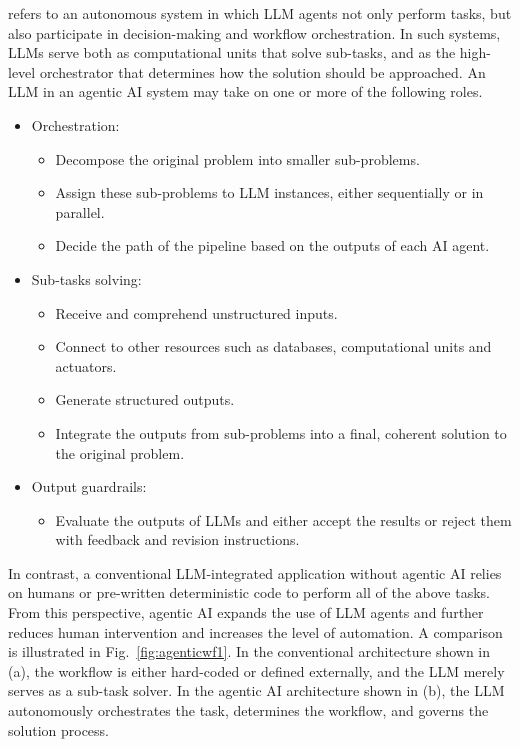  refers to an autonomous system in which LLM agents not only perform tasks, but also participate in decision-making and workflow orchestration. In such systems, LLMs serve both as computational units that solve sub-tasks, and as the high-level orchestrator that determines how the solution should be approached. An LLM in an agentic AI system may take on one or more of the following roles.
\begin{itemize}
    \item Orchestration:
    \begin{itemize}
    	\item Decompose the original problem into smaller sub-problems.
    	\item Assign these sub-problems to LLM instances, either sequentially or in parallel.
        \item Decide the path of the pipeline based on the outputs of each AI agent.
    \end{itemize}
    \item Sub-tasks solving:
    \begin{itemize}
      \item Receive and comprehend unstructured inputs.
      \item Connect to other resources such as databases, computational units and actuators.
      \item Generate structured outputs.
      \item Integrate the outputs from sub-problems into a final, coherent solution to the original problem.
    \end{itemize}
    \item Output guardrails:
    \begin{itemize}
      \item Evaluate the outputs of LLMs and either accept the results or reject them with feedback and revision instructions.
    \end{itemize}
\end{itemize}

In contrast, a conventional LLM-integrated application without agentic AI relies on humans or pre-written deterministic code to perform all of the above tasks. From this perspective, agentic AI expands the use of LLM agents and further reduces human intervention and increases the level of automation. A comparison is illustrated in Fig.~\ref{fig:agenticwf1}. In the conventional architecture shown in (a), the workflow is either hard-coded or defined externally, and the LLM merely serves as a sub-task solver. In the agentic AI architecture shown in (b), the LLM autonomously orchestrates the task, determines the workflow, and governs the solution process.

